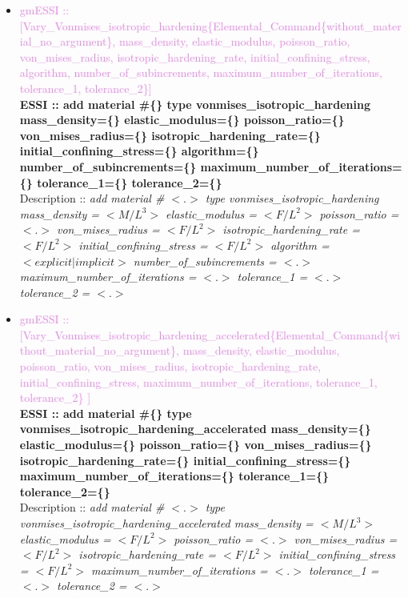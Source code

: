 \documentclass[11pt]{article}
\begin{document}
\begin{itemize}
    \item \textcolor{violet}{gmESSI :: [Vary\_Vonmises\_isotropic\_hardening\{Elemental\_Command\{without\_material\_no\_argument\}, mass\_density, elastic\_modulus, poisson\_ratio, von\_mises\_radius, isotropic\_hardening\_rate, initial\_confining\_stress, algorithm, number\_of\_subincrements, maximum\_number\_of\_iterations, tolerance\_1, tolerance\_2\}]}\\
    \textbf{ESSI :: add material \#\{\} type vonmises\_isotropic\_hardening mass\_density=\{\} elastic\_modulus=\{\}  poisson\_ratio=\{\}  von\_mises\_radius=\{\}  isotropic\_hardening\_rate=\{\}  initial\_confining\_stress=\{\} algorithm=\{\}  number\_of\_subincrements=\{\}  maximum\_number\_of\_iterations=\{\}  tolerance\_1=\{\}  tolerance\_2=\{\}}\\
    Description ::  \textit{ add material \# $<.>$ type vonmises\_isotropic\_hardening mass\_density = $<M/L^3>$ elastic\_modulus = $<F/L^2>$ poisson\_ratio = $<.>$ von\_mises\_radius = $<F/L^2>$ isotropic\_hardening\_rate = $<F/L^2>$ initial\_confining\_stress = $<F/L^2>$ algorithm = $<explicit|implicit>$ number\_of\_subincrements = $<.>$ maximum\_number\_of\_iterations = $<.>$ tolerance\_1 = $<.>$ tolerance\_2 = $<.>$} 

    \item \textcolor{violet}{gmESSI :: [Vary\_Vonmises\_isotropic\_hardening\_accelerated\{Elemental\_Command\{without\_material\_no\_argument\}, mass\_density, elastic\_modulus, poisson\_ratio, von\_mises\_radius, isotropic\_hardening\_rate, initial\_confining\_stress, maximum\_number\_of\_iterations, tolerance\_1, tolerance\_2\} ]}\\
    \textbf{ESSI :: add material \#\{\} type vonmises\_isotropic\_hardening\_accelerated mass\_density=\{\} elastic\_modulus=\{\} poisson\_ratio=\{\} von\_mises\_radius=\{\} isotropic\_hardening\_rate=\{\} initial\_confining\_stress=\{\} maximum\_number\_of\_iterations=\{\} tolerance\_1=\{\} tolerance\_2=\{\} } \\
    Description ::  \textit{ add material \# $<.>$ type vonmises\_isotropic\_hardening\_accelerated mass\_density = $<M/L^3>$ elastic\_modulus = $<F/L^2>$ poisson\_ratio = $<.>$ von\_mises\_radius = $<F/L^2>$ isotropic\_hardening\_rate = $<F/L^2>$ initial\_confining\_stress = $<F/L^2>$  maximum\_number\_of\_iterations = $<.>$ tolerance\_1 = $<.>$ tolerance\_2 = $<.>$} 


\end{itemize}
\end{document}
